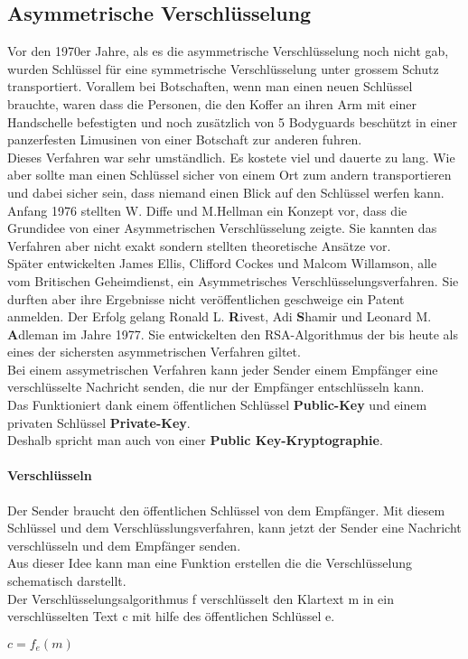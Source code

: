 \subsection{Asymmetrische Verschlüsselung}
Vor den 1970er Jahre, als es die asymmetrische Verschlüsselung noch nicht gab, wurden Schlüssel für eine symmetrische Verschlüsselung unter grossem Schutz transportiert.
Vorallem bei Botschaften, wenn man einen neuen Schlüssel brauchte, waren dass die Personen, die den Koffer an ihren Arm mit einer Handschelle befestigten und noch zusätzlich von 5 Bodyguards beschützt in einer panzerfesten Limusinen von einer Botschaft zur anderen fuhren.\\
Dieses Verfahren war sehr umständlich. Es kostete viel und dauerte zu lang. Wie aber sollte man einen Schlüssel sicher von einem Ort zum andern transportieren und dabei sicher sein, dass niemand einen Blick auf den Schlüssel werfen kann.\\
Anfang 1976 stellten W. Diffe und M.Hellman ein Konzept vor, dass die Grundidee von einer Asymmetrischen Verschlüsselung zeigte. Sie kannten das Verfahren aber nicht exakt sondern stellten theoretische Ansätze vor.\\ %
Später entwickelten James Ellis, Clifford Cockes und Malcom Willamson, alle vom Britischen Geheimdienst, ein Asymmetrisches Verschlüsselungsverfahren. Sie durften aber ihre Ergebnisse nicht veröffentlichen geschweige ein Patent anmelden. 
Der Erfolg gelang Ronald L. \textbf{R}ivest, Adi \textbf{S}hamir und Leonard M. \textbf{A}dleman im Jahre 1977. Sie entwickelten den RSA-Algorithmus der bis heute als eines der sichersten asymmetrischen Verfahren giltet.\\[2ex]
%
Bei einem assymetrischen Verfahren kann jeder Sender einem Empfänger eine verschlüsselte Nachricht senden, die nur der Empfänger entschlüsseln kann.\\
%
Das Funktioniert dank einem öffentlichen Schlüssel \textbf{Public-Key} und einem privaten Schlüssel \textbf{Private-Key}. \\
Deshalb spricht man auch von einer  \textbf{Public Key-Kryptographie}.
%
\paragraph{Verschlüsseln}
Der Sender braucht den öffentlichen Schlüssel von dem Empfänger. Mit diesem Schlüssel und dem Verschlüsslungsverfahren, kann jetzt der Sender eine Nachricht verschlüsseln und dem Empfänger senden.\\
Aus dieser Idee kann man eine Funktion erstellen die die Verschlüsselung schematisch darstellt.\\
Der Verschlüsselungsalgorithmus f verschlüsselt den Klartext m in ein verschlüsselten Text c mit hilfe des öffentlichen Schlüssel e.
 \begin{center}
 $ c = f_e (m) $
 \end{center}

